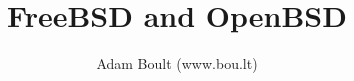 \documentclass[oneside]{book}
\begin{document}
\author{Adam Boult (www.bou.lt)}
\title{FreeBSD and OpenBSD}
\maketitle

\setcounter{tocdepth}{0}
\tableofcontents


\end{document}
